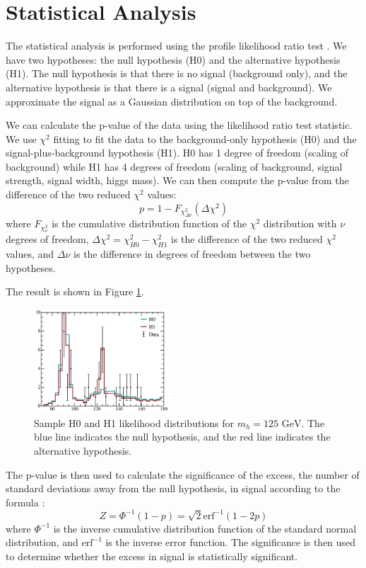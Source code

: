 \section{Statistical Analysis}
The statistical analysis is performed using the profile likelihood ratio test \cite{Cowan:2010js}. We have two hypotheses: the null hypothesis (H0) and the alternative hypothesis (H1). The null hypothesis is that there is no signal (background only), and the alternative hypothesis is that there is a signal (signal and background). We approximate the signal as a Gaussian distribution on top of the background. 


We can calculate the p-value of the data using the likelihood ratio test statistic. We use $\chi^2$ fitting to fit the data to the background-only hypothesis (H0) and the signal-plus-background hypothesis (H1). H0 has 1 degree of freedom (scaling of background) while H1 has 4 degrees of freedom (scaling of background, signal strength, signal width, higgs mass). We can then compute the p-value from the difference of the two reduced $\chi^2$ values:
\begin{equation}
  p = 1 - F_{\chi^2_{\Delta \nu}}(\Delta \chi^2)
\end{equation}
where $F_{\chi^2_{\nu}}$ is the cumulative distribution function of the $\chi^2$ distribution with $\nu$ degrees of freedom, $\Delta \chi^2 = \chi^2_{H0} - \chi^2_{H1}$ is the difference of the two reduced $\chi^2$ values, and $\Delta\nu$ is the difference in degrees of freedom between the two hypotheses. 

The result is shown in Figure \ref{fig:likelihood}. 
\begin{figure}[h]
  \centering
  \includegraphics[width=0.45\textwidth]{Figures/hypo_testing.png}
  \caption{Sample H0 and H1 likelihood distributions for $m_h=125\text{ GeV}$. The blue line indicates the null hypothesis, and the red line indicates the alternative hypothesis.}
  \label{fig:likelihood}
\end{figure}

The p-value is then used to calculate the significance of the excess, the number of standard deviations away from the null hypothesis, in signal according to the formula \cite{Cowan:2010js}:
\begin{equation}
  Z = \Phi^{-1}(1 - p) = \sqrt{2} \text{erf}^{-1}(1 - 2p)
\end{equation}
where $\Phi^{-1}$ is the inverse cumulative distribution function of the standard normal distribution, and $\text{erf}^{-1}$ is the inverse error function. The significance is then used to determine whether the excess in signal is statistically significant.

